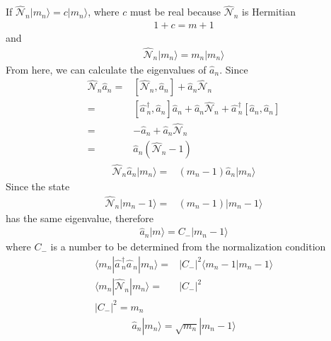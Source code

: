\begin{frame}
If $\widehat{\mathcal{N}}_n|m_n\rangle=c|m_n\rangle$, where $c$ must be real because $\widehat{\mathcal{N}}_n$ is Hermitian
\begin{align}
  1+c=m+1
\end{align}
and
\begin{align}
  \widehat{\mathcal{N}}_n|m_n\rangle=m_n|m_n\rangle
\end{align}
From here, we can calculate the eigenvalues of $\widehat{a}_n$. Since
\begin{align}
\widehat{\mathcal{N}}_n\widehat{a}_n=&  
\left[\widehat{\mathcal{N}}_n,\widehat{a}_n\right]+
\widehat{a}_n\widehat{\mathcal{N}}_n\nonumber\\
=&\left[\widehat{a\,}_n^\dagger,\widehat{a}_n\right]\widehat{a}_n
+\widehat{a}_n\widehat{\mathcal{N}}_n
+\widehat{a\,}_n^\dagger\left[\widehat{a}_n,\widehat{a}_n\right]\nonumber\\
=&-\widehat{a}_n+\widehat{a}_n\widehat{\mathcal{N}}_n\nonumber\\
=&\widehat{a}_n\left(\widehat{\mathcal{N}}_n-1\right)
\end{align}
\begin{align}
  \widehat{\mathcal{N}}_n\widehat{a}_n|m_n\rangle=&(m_n-1)\widehat{a}_n|m_n\rangle
\end{align}
Since the state
\begin{align}
   \widehat{\mathcal{N}}_n|m_n-1\rangle=&(m_n-1)|m_n-1\rangle
\end{align}
has the same eigenvalue, therefore
\begin{align}
  \widehat{a}_n|m\rangle=C_-|m_n-1\rangle
\end{align}
where $C_-$ is a number to be determined from the normalization condition
\begin{align}
\label{eq:131}
   \langle m_n|\widehat{a\,}_{n}^\dagger\widehat{a\,}_{n}  |m_n\rangle=&
\left|C_-\right|^2\langle m_n-1|m_n-1\rangle\nonumber\\
   \langle m_n|\widehat{\mathcal{N}}_n|m_n\rangle=&
\left|C_-\right|^2\nonumber\\
\left|C_-\right|^2=m_n
\end{align}
\begin{align}
  \widehat{a}_n|m_n\rangle=\sqrt{m_n}|m_n-1\rangle
\end{align}




\end{frame}

